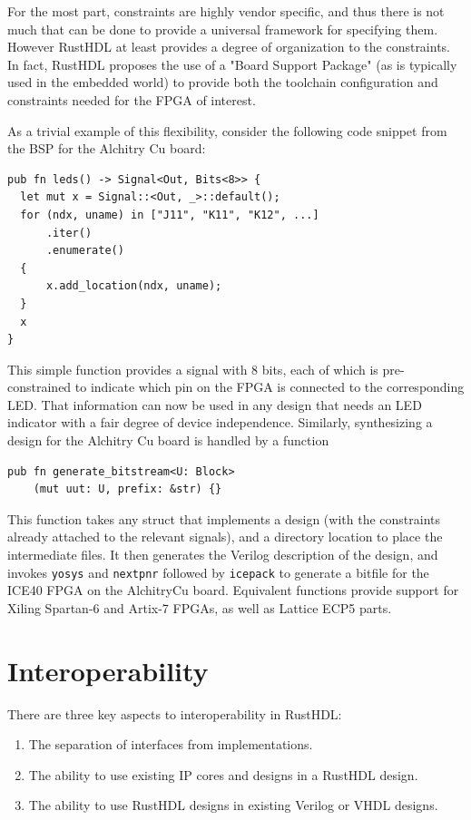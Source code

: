 \documentclass[conference]{IEEEtran}
\begin{document}
For the most part, constraints are highly vendor specific, and thus there is not much that can be done to provide
a universal framework for specifying them.  However RustHDL at least provides a degree of organization to the constraints.
In fact, RustHDL proposes the use of a "Board Support Package" (as is typically used in the embedded world) to provide 
both the toolchain configuration and constraints needed for the FPGA of interest.  

As a trivial example of this flexibility, consider the following code snippet from the BSP for the Alchitry Cu board:

\begin{verbatim}
pub fn leds() -> Signal<Out, Bits<8>> {
  let mut x = Signal::<Out, _>::default();
  for (ndx, uname) in ["J11", "K11", "K12", ...]
      .iter()
      .enumerate()
  {
      x.add_location(ndx, uname);
  }
  x
}
\end{verbatim}

This simple function provides a signal with 8 bits, each of which is pre-constrained to indicate which pin on the 
FPGA is connected to the corresponding LED.  That information can now be used in any design that needs an LED 
indicator with a fair degree of device independence.  Similarly, synthesizing a design for the Alchitry Cu board 
is handled by a function

\begin{verbatim}
pub fn generate_bitstream<U: Block>
    (mut uut: U, prefix: &str) {}
\end{verbatim}

This function takes any struct that implements a design (with the constraints already attached to the relevant
signals), and a directory location to place the intermediate files.  It then generates the Verilog description of
the design, and invokes \verb|yosys| and \verb|nextpnr| followed by \verb|icepack| to generate a bitfile for the ICE40 FPGA on the
AlchitryCu board.  Equivalent functions provide support for Xiling Spartan-6 and Artix-7 FPGAs, as well as Lattice ECP5 parts.

\section{Interoperability}

There are three key aspects to interoperability in RustHDL:

\begin{enumerate}
  \item The separation of interfaces from implementations.
  \item The ability to use existing IP cores and designs in a RustHDL design.
  \item The ability to use RustHDL designs in existing Verilog or VHDL designs.
\end{enumerate}
\end{document}
